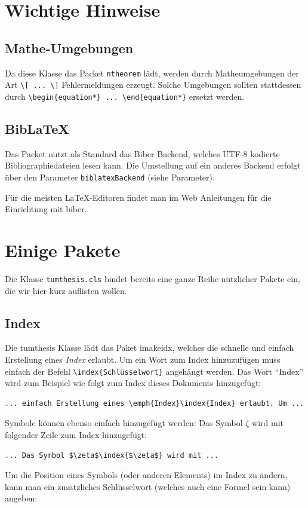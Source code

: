 \section{Wichtige Hinweise}
\label{sec:intro:hinweise}
\subsection{Mathe-Umgebungen}
Da diese Klasse das Packet \texttt{ntheorem} lädt, werden durch Matheumgebungen der Art 
\verb|\[ ... \]| Fehlermeldungen erzeugt. Solche Umgebungen sollten stattdessen durch
\verb|\begin{equation*} ... \end{equation*}| ersetzt werden.

\subsection{BibLaTeX}
\label{sec:intro:biblatex}
Das Packet nutzt als Standard das Biber Backend, welches UTF-8 kodierte Bibliographiedateien 
lesen kann. Die Umstellung auf ein anderes Backend erfolgt über den Parameter \texttt{biblatexBackend} (siehe Parameter).

Für die meisten \LaTeX-Editoren findet man im Web Anleitungen für die Einrichtung mit biber.
\section{Einige Pakete}
\label{sec:intro:pakete}
Die Klasse \texttt{tumthesis.cls} bindet bereits eine ganze Reihe nützlicher
Pakete ein, die wir hier kurz auflisten wollen.

\subsection{Index}
\label{sec:intro:index}
Die tumthesis Klasse lädt das Paket imakeidx, welches die schnelle und einfach Erstellung eines \emph{Index} erlaubt. Um ein Wort zum Index hinzuzufügen muss einfach der Befehl \verb|\index{Schlüsselwort}| angehängt werden. Das Wort \enquote{Index} wird zum Beispiel wie folgt zum Index dieses Dokuments hinzugefügt:
\begin{lstlisting}[language={[LaTeX]TeX}]
  ... einfach Erstellung eines \emph{Index}\index{Index} erlaubt. Um ...
\end{lstlisting}
Symbole können ebenso einfach hinzugefügt werden: Das Symbol $\zeta$\index{$\zeta$} wird mit folgender Zeile zum Index hinzugefügt:
\begin{lstlisting}[language={[LaTeX]TeX}]
  ... Das Symbol $\zeta$\index{$\zeta$} wird mit ...
\end{lstlisting}
Um die Position eines Symbols (oder anderen Elements) im Index zu ändern, kann man ein zusätzliches Schlüsselwort (welches auch eine Formel sein kann) angeben:

